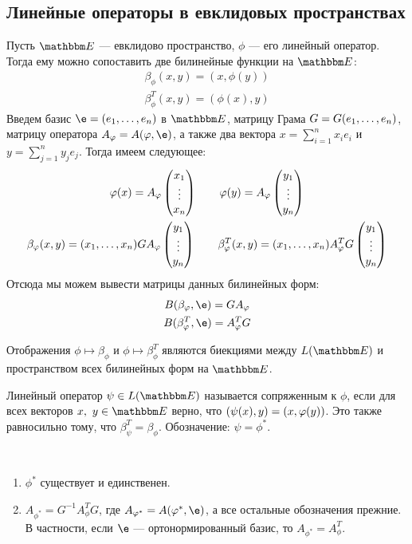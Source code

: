 \subsection*{Линейные операторы в евклидовых пространствах}

Пусть $\E$ --- евклидово пространство, $\phi$ --- его линейный оператор. Тогда ему можно сопоставить две билинейные функции на $\E$:
\begin{gather*}
\beta_\phi(x, y) = (x, \phi(y)) \\
\beta^T_\phi(x, y) = (\phi(x), y)
\end{gather*}
Введем базис $\e = \vector{e}$ в $\E$, матрицу Грама $G = G({e}_1, \ldots, {e}_n)$, матрицу оператора $A_\phi \hm= A(\phi, \e)$, а также два вектора $x = \sum_{i = 1}^{n}x_ie_i$ и $y = \sum_{j = 1}^{n}y_je_j$. Тогда имеем следующее:
\begin{gather*}
\varphi(x) = A_\varphi\begin{pmatrix}{x}_1 \\\vdots\\{x}_n\end{pmatrix} \qquad \varphi(y) = A_\varphi \begin{pmatrix}{y}_1 \\\vdots\\{y}_n\end{pmatrix} \\ 
\beta_\varphi(x, y) = ({x}_1, \ldots, {x}_n) GA_\varphi \begin{pmatrix}{y}_1 \\\vdots\\{y}_n\end{pmatrix} \qquad
\beta^T_\varphi(x, y) = ({x}_1, \ldots, {x}_n)A_\varphi^TG\begin{pmatrix}{y}_1 \\\vdots\\{y}_n\end{pmatrix}
\end{gather*}
Отсюда мы можем вывести матрицы данных билинейных форм:
\begin{gather*}
B(\beta_\phi, \e) = GA_\phi \\
B(\beta^T_\phi, \e) = A^T_\phi G
\end{gather*}

\begin{Comment}
Отображения $\phi \mapsto \beta_\phi$ и $\phi \mapsto \beta^T_\phi$ являются биекциями между $L(\E)$ и пространством всех билинейных форм на $\E$.
\end{Comment}

\begin{Def}
Линейный оператор $\psi \in L(\E)$ называется сопряженным к $\phi$, если для всех векторов $x,\ y \in \E$ верно, что $(\psi(x), y)\hm = (x, \phi(y))$. Это также равносильно тому, что $\beta_\psi^T = \beta_\phi$. Обозначение: $\psi = \phi^*$.
\end{Def}

\begin{Suggestion}\ 
\begin{enumerate}
\item $\phi^*$ существует и единственен.
\item $A_{\phi^*} = G^{-1}A_\phi^TG$, где $A_{\phi^*} = A(\phi^*, \e)$, а все остальные обозначения прежние. В частности, если $\e$ --- ортонормированный базис, то $A_{\phi^*} = A_{\phi}^T$.
\end{enumerate}
\end{Suggestion}

